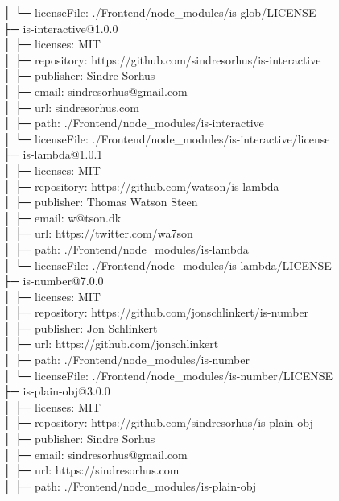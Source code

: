 \documentclass[
    paper=a4,
    twoside=false,
    parskip=half,
    listof=entryprefix,
    listof=totoc,
    index=totoc,
    bibliography=totoc,
    headsepline,
]{scrbook}
\begin{document}
    │  └─ licenseFile: ./Frontend/node\_modules/is-glob/LICENSE\\
    ├─ is-interactive@1.0.0\\
    │  ├─ licenses: MIT\\
    │  ├─ repository: https://github.com/sindresorhus/is-interactive\\
    │  ├─ publisher: Sindre Sorhus\\
    │  ├─ email: sindresorhus@gmail.com\\
    │  ├─ url: sindresorhus.com\\
    │  ├─ path: ./Frontend/node\_modules/is-interactive\\
    │  └─ licenseFile: ./Frontend/node\_modules/is-interactive/license\\
    ├─ is-lambda@1.0.1\\
    │  ├─ licenses: MIT\\
    │  ├─ repository: https://github.com/watson/is-lambda\\
    │  ├─ publisher: Thomas Watson Steen\\
    │  ├─ email: w@tson.dk\\
    │  ├─ url: https://twitter.com/wa7son\\
    │  ├─ path: ./Frontend/node\_modules/is-lambda\\
    │  └─ licenseFile: ./Frontend/node\_modules/is-lambda/LICENSE\\
    ├─ is-number@7.0.0\\
    │  ├─ licenses: MIT\\
    │  ├─ repository: https://github.com/jonschlinkert/is-number\\
    │  ├─ publisher: Jon Schlinkert\\
    │  ├─ url: https://github.com/jonschlinkert\\
    │  ├─ path: ./Frontend/node\_modules/is-number\\
    │  └─ licenseFile: ./Frontend/node\_modules/is-number/LICENSE\\
    ├─ is-plain-obj@3.0.0\\
    │  ├─ licenses: MIT\\
    │  ├─ repository: https://github.com/sindresorhus/is-plain-obj\\
    │  ├─ publisher: Sindre Sorhus\\
    │  ├─ email: sindresorhus@gmail.com\\
    │  ├─ url: https://sindresorhus.com\\
    │  ├─ path: ./Frontend/node\_modules/is-plain-obj\\
\end{document}
